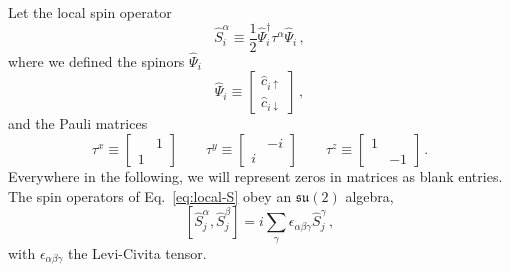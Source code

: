 Let the local spin operator
\begin{equation}\label{eq:local-S}
	\hat S_i^\alpha \equiv \frac{1}{2} \hat \Psi_i^\dagger \tau^\alpha \hat \Psi_i \, ,
\end{equation}
where we defined the spinors $\hat \Psi_i$
\begin{equation}\label{eq:Psi-onsite}
	\hat \Psi_i \equiv \begin{bmatrix}
		\hat c_{i\uparrow} \\ \hat c_{i\downarrow}
	\end{bmatrix} \, ,
\end{equation}
and the Pauli matrices
\begin{equation}\label{eq:pauli-def}
	\tau^x \equiv \begin{bmatrix}
		& 1 \\
		1 &
	\end{bmatrix}
	\qquad
	\tau^y \equiv \begin{bmatrix}
		& -i \\
		i &
	\end{bmatrix}
	\qquad
	\tau^z \equiv \begin{bmatrix}
		1 & \\
		& -1
	\end{bmatrix} \, .
\end{equation}
Everywhere in the following, we will represent zeros in matrices as blank entries. The spin operators of Eq.~\eqref{eq:local-S} obey an $\mathfrak{su}(2)$ algebra,
\begin{equation}\label{eq:local-su(2)}
	\left[ \hat S_j^\alpha, \hat S_j^\beta \right] = i \sum_\gamma \epsilon_{\alpha\beta\gamma} \hat S_j^\gamma \, ,
\end{equation}
with $\epsilon_{\alpha\beta\gamma}$ the Levi-Civita tensor.

